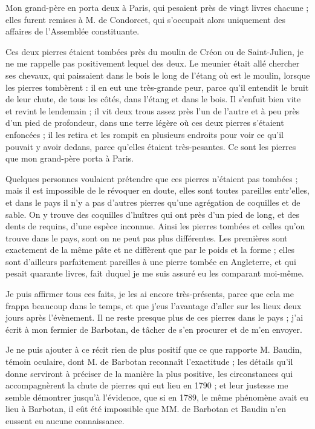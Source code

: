 \documentclass[a4paper, 12pt, oneside, french]{article}
\begin{document}
\og Mon grand-père en porta deux à Paris, qui pesaient près de vingt livres chacune ; elles furent remises à M. de Condorcet, qui s'occupait alors uniquement des affaires de l'Assemblée constituante. \fg

\og Ces deux pierres étaient tombées près du moulin de Créon ou de Saint-Julien, je ne me rappelle pas positivement lequel des deux. Le meunier était allé chercher ses chevaux, qui paissaient dans le bois le long de l'étang où est le moulin, lorsque les pierres tombèrent : il en eut une très-grande peur, parce qu'il entendit le bruit de leur chute, de tous les côtés, dans l'étang et dans le bois. Il s'enfuit bien vite et revint le lendemain ; il vit deux trous assez près l'un de l'autre et à peu près d'un pied de profondeur, dans une terre légère où ces deux pierres s'étaient enfoncées ; il les retira et les rompit en plusieurs endroits pour voir ce qu'il pouvait y avoir dedans, parce qu'elles étaient très-pesantes. Ce sont les pierres que mon grand-père porta à Paris. \fg

\og Quelques personnes voulaient prétendre que ces pierres n'étaient pas tombées ; mais il est impossible de le révoquer en doute, elles sont toutes pareilles entr'elles, et dans le pays il n'y a pas d'autres pierres qu'une agrégation de coquilles et de sable. On y trouve des coquilles d'huîtres qui ont près d'un pied de long, et des dents de requins, d'une espèce inconnue. Ainsi les pierres tombées et celles qu'on trouve dans le pays, sont on ne peut pas plus différentes. Les premières sont exactement de la même pâte et ne diffèrent que par le poids et la forme ; elles sont d'ailleurs parfaitement pareilles à une pierre tombée en Angleterre, et qui pesait quarante livres, fait duquel je me suis assuré eu les comparant moi-même. \fg

\og Je puis affirmer tous ces faits, je les ai encore très-présents, parce que cela me frappa beaucoup dans le temps, et que j'eus l'avantage d'aller sur les lieux deux jours après l'évènement. Il ne reste presque plus de ces pierres dans le pays ; j'ai écrit à mon fermier de Barbotan, de tâcher de s'en procurer et de m'en envoyer. \fg

Je ne puis ajouter à ce récit rien de plus positif que ce que rapporte M. Baudin, témoin oculaire, dont M. de Barbotan reconnaît l'exactitude ; les détails qu'il donne serviront à préciser de la manière la plus positive, les circonstances qui accompagnèrent la chute de pierres qui eut lieu en 1790 ; et leur justesse me semble démontrer jusqu'à l'évidence, que si en 1789, le même phénomène avait eu lieu à Barbotan, il eût été impossible que MM. de Barbotan et Baudin n'en eussent eu aucune connaissance.
\end{document}
